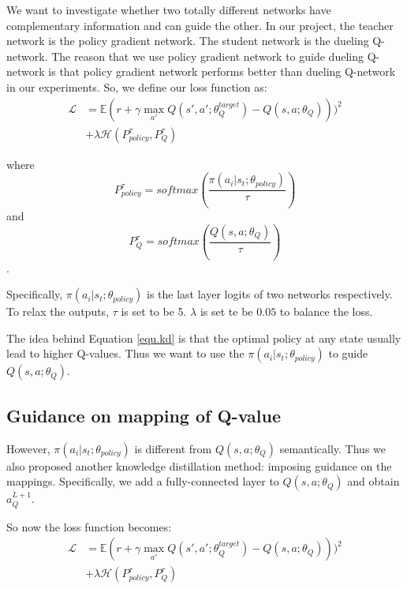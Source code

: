 %
We want to investigate whether two totally different networks have complementary information and can guide the other.
%
In our project, the teacher network is the policy gradient network. The student network is the dueling Q-network. The reason that we use policy gradient network to guide dueling Q-network is that policy gradient network performs better than dueling Q-network in our experiments.
%
So, we define our loss function as:
\begin{equation}
\begin{split}
\mathcal{L} &= \mathbb{E}(r+\gamma \max_{a'}Q(s',a';\theta^{target}_{Q})-Q(s,a;\theta_{Q})))^2  \\
& + \lambda\mathcal{H} ( P^{\tau}_{policy},P^{\tau}_{Q} )
\end{split}
\label{equ.kd}
\end{equation}

\noindent
where 
$$P^{\tau}_{policy} = softmax(\frac{\pi(a_i|s_t;\theta_{policy})}{\tau})$$
and  
$$P^{\tau}_{Q} = softmax( \frac{Q(s,a;\theta_{Q})} {\tau} )$$.

\noindent
Specifically, $\pi(a_i|s_t;\theta_{policy})$ is the last layer logits of two networks respectively. To relax the outputs, $\tau$ is set to be 5. $\lambda$ is set te be $0.05$ to balance the loss.

The idea behind Equation \ref{equ.kd} is that the optimal policy at any state usually lead to higher Q-values. Thus we want to use the $\pi(a_i|s_t;\theta_{policy})$ to guide $Q(s,a;\theta_{Q})$.

\subsection{Guidance on mapping of Q-value}
However,  $\pi(a_i|s_t;\theta_{policy})$ is different from $Q(s,a;\theta_{Q})$ semantically. Thus we also proposed another knowledge distillation method: imposing guidance on the mappings.
%
Specifically, we add a fully-connected layer to $Q(s,a;\theta_{Q})$ and obtain  $a^{L+1}_{Q}$.

So now the loss function becomes:
\begin{equation}
\begin{split}
\mathcal{L} &= \mathbb{E}(r+\gamma \max_{a'}Q(s',a';\theta^{target}_{Q})-Q(s,a;\theta_{Q})))^2  \\
& + \lambda\mathcal{H} ( P^{\tau}_{policy},P^{\tau}_{Q} )
\end{split}
\label{equ.kd}
\end{equation}

